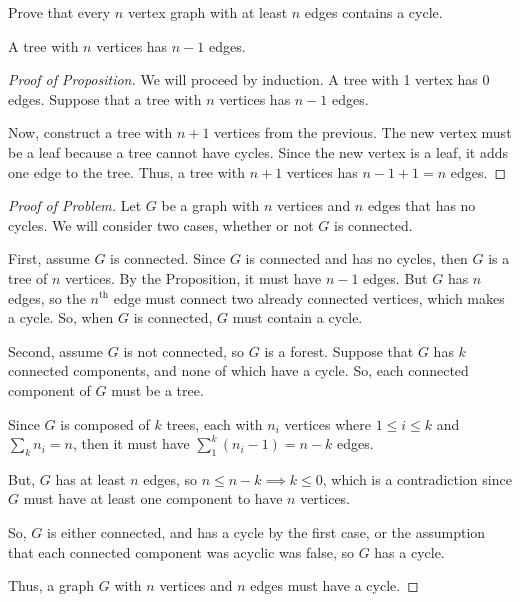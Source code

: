 \documentclass[../hw4]{subfiles}
\begin{document}
\begin{problem}
Prove that every $n$ vertex graph with at least $n$ edges contains a cycle.
\end{problem}
\begin{proposition}
	A tree with $n$ vertices has  $n-1$ edges.
\end{proposition}
\begin{proof}[Proof of Proposition]
	We will proceed by induction.
	A tree with 1 vertex has 0 edges.
	Suppose that a tree with $n$ vertices has  $n-1$ edges.

	Now, construct a tree with  $n+1$ vertices from the previous.
	The new vertex must be a leaf because a tree cannot have cycles.
	Since the new vertex is a leaf, it adds one edge to the tree.
	Thus, a tree with $n+1$ vertices has  $n-1+1=n$ edges.
\end{proof}
\begin{proof}[Proof of Problem]
	Let $G$ be a graph with $n$ vertices and $n$ edges that has no cycles.
	We will consider two cases, whether or not  $G$ is connected.

	First, assume $G$ is connected.
	Since $G$ is connected and has no cycles, then $G$ is a tree of $n$ vertices.
	By the Proposition, it must have $n-1$ edges.
	But $G$ has  $n$ edges, so the  $n^{\text{th}}$ edge must connect two already connected vertices,
	which makes a cycle.
	So, when $G$ is connected, $G$ must contain a cycle.

	Second, assume $G$ is not connected, so $G$ is a forest.
	Suppose that $G$ has $k$ connected components, and none of which have a cycle.
	So, each connected component of $G$ must be a tree.

	Since $G$ is composed of $k$ trees, each with $n_i$ vertices where $1\le i\le k$ and $\sum_{k}n_i = n$,
	then it must have $\sum_{1 }^{k} (n_i-1) = n - k$ edges.

	But, $G$ has at least $n$ edges, so $n \le n - k \implies k \le 0$,
	which is a contradiction since $G$ must have at least one component to have $n$ vertices.

	So, $G$ is either connected, and has a cycle by the first case,
	or the assumption that each connected component was acyclic was false, so $G$ has a cycle.

	Thus, a graph $G$ with $n$ vertices and  $n$ edges must have a cycle.
\end{proof}
\end{document}
